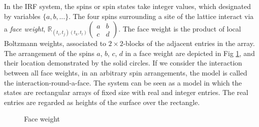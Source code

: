 \documentclass[a4paper,11pt]{article}%
\numberwithin{equation}{section}
\begin{document}
In the IRF system, the spins or spin states take integer values, which designated by variables $\{a, b, . . .\}$. The four spins surrounding a site of the lattice interact via a
 \textit{face weight}, $\mathbb{R}_{{{(t_i,t_j)(t_k,t_l)}}}\left(\begin{array}{cc}
{a} & {b} \\
{c} & {d}\end{array}\right)$.  The face weight is the product of local Boltzmann weights, associated
to $2\times2$-blocks of the adjacent entries in the array. The arrangement of the spins ${a}$, ${b}$, ${c}$, ${d}$ in a face weight are depicted in Fig \ref{fw}, and their location demonstrated by the solid circles. If we consider the interaction between all face weights, in an arbitrary spin arrangements, the model is called the interaction-round-a-face.  The system can be seen as a model in which the  states are
rectangular arrays of fixed size with real and integer entries. The real entries are regarded as 
heights of the surface over the rectangle.
\begin{figure}[H] 
\centering
{}
\caption{Face weight}
\label{fw}
 \end{figure}
  
\end{document}
